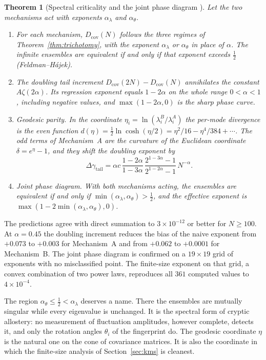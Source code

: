\documentclass[11pt,reqno]{amsart}
\theoremstyle{plain}
\newtheorem{theorem}{Theorem}[section]
\theoremstyle{definition}
\theoremstyle{remark}
\numberwithin{equation}{section}
\begin{document}
\begin{theorem}[Spectral criticality and the joint phase diagram \cite{ChenChen2026III}]\label{thm:spectral}
Let the two mechanisms act with exponents $\alpha_\lambda$ and $\alpha_\theta$.
\begin{enumerate}[label=\textup{(\arabic*)},leftmargin=*]
\item For each mechanism, $D_{\mathrm{cov}}(N)$ follows the three regimes of Theorem~\ref{thm:trichotomy}, with the exponent $\alpha_\lambda$ or $\alpha_\theta$ in place of $\alpha$. The infinite ensembles are equivalent if and only if that exponent exceeds $\tfrac12$ (Feldman--H\'ajek).
\item The doubling tail increment $D_{\mathrm{cov}}(2N)-D_{\mathrm{cov}}(N)$ annihilates the constant $A\zeta(2\alpha)$. Its regression exponent equals $1-2\alpha$ on the whole range $0<\alpha<1$, including negative values, and $\max(1-2\alpha,0)$ is the sharp phase curve.
\item \emph{Geodesic parity.} In the coordinate $\eta_i=\ln(\lambda^B_i/\lambda^A_i)$ the per-mode divergence is the even function $d(\eta)=\tfrac12\ln\cosh(\eta/2)=\eta^2/16-\eta^4/384+\cdots$. The odd terms of Mechanism~A are the curvature of the Euclidean coordinate $\delta=e^\eta-1$, and they shift the doubling exponent by
\[
\Delta\gamma_{\mathrm{tail}}=\alpha c\,\frac{1-2\alpha}{1-3\alpha}\,\frac{2^{1-3\alpha}-1}{2^{1-2\alpha}-1}\,N^{-\alpha}.
\]
\item \emph{Joint phase diagram.} With both mechanisms acting, the ensembles are equivalent if and only if $\min(\alpha_\lambda,\alpha_\theta)>\tfrac12$, and the effective exponent is $\max(1-2\min(\alpha_\lambda,\alpha_\theta),0)$.
\end{enumerate}
\end{theorem}

The predictions agree with direct summation to $3\times10^{-12}$ or better for $N\ge100$. At $\alpha=0.45$ the doubling increment reduces the bias of the naive exponent from $+0.073$ to $+0.003$ for Mechanism~A and from $+0.062$ to $+0.0001$ for Mechanism~B. The joint phase diagram is confirmed on a $19\times19$ grid of exponents with no misclassified point. The finite-size exponent on that grid, a convex combination of two power laws, reproduces all $361$ computed values to $4\times10^{-4}$.

The region $\alpha_\theta\le\tfrac12<\alpha_\lambda$ deserves a name. There the ensembles are mutually singular while every eigenvalue is unchanged. It is the spectral form of cryptic allostery: no measurement of fluctuation amplitudes, however complete, detects it, and only the rotation angles $\theta_i$ of the fingerprint do. The geodesic coordinate $\eta$ is the natural one on the cone of covariance matrices. It is also the coordinate in which the finite-size analysis of Section~\ref{sec:kms} is cleanest.
\end{document}

